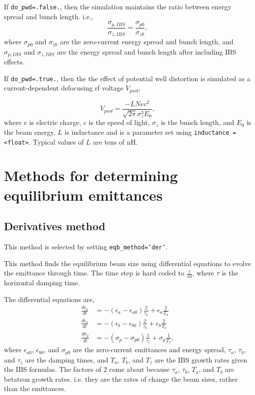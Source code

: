 \documentclass[11pt]{article}
\begin{document}
If {\tt do_pwd=.false.}, then the simulation maintains the ratio between energy spread and bunch length.
i.e.,
\begin{equation}
\frac{\sigma_{p,IBS}}{\sigma_{z,IBS}}=\frac{\sigma_{p0}}{\sigma_{z0}},
\end{equation}
where $\sigma_{p0}$ and $\sigma_{z0}$ are the zero-current energy spread and bunch length,
and $\sigma_{p,IBS}$ and $\sigma_{z,IBS}$ are the energy spread and bunch length after
including IBS effects.

If {\tt do_pwd=.true.}, then the the effect of potential well distortion is simulated as a 
current-dependent defocusing rf voltage $V_{pwd}$,

\begin{equation}
V_{pwd}=\frac{-L N e c^2}{\sqrt{2\pi}\sigma_z^3 E_0},
\end{equation}
where $e$ is electric charge, $c$ is the speed of light,
$\sigma_z$ is the bunch length, and $E_0$ is the beam energy.
$L$ is inductance and is a parameter set using {\tt inductance = <float>}.
Typical values of $L$ are tens of nH.

\section{Methods for determining equilibrium emittances}

\subsection{Derivatives method}
This method is selected by setting {\tt eqb_method=`der'}.

This method finds the equilibrium beam size using differential equations to 
evolve the emittance through time.  The time step is hard coded to $\frac{\tau}{10}$,
where $\tau$ is the horizontal damping time.

The differential equations are,
\begin{align}
\frac{d\epsilon_a}{dt}&= -\left(\epsilon_a-\epsilon_{a0}\right)\frac{2}{\tau_a}+\epsilon_a\frac{2}{T_a}\label{e:da}\\
\frac{d\epsilon_b}{dt}&= -\left(\epsilon_b-\epsilon_{b0}\right)\frac{2}{\tau_b}+\epsilon_b\frac{2}{T_b}\label{e:db}\\
\frac{d \sigma_p}{dt}&= -\left(\sigma_p-\sigma_{p0}\right)\frac{1}{\tau_z}+\sigma_p\frac{1}{T_z}\label{e:dp},
\end{align}
where $\epsilon_{a0}$, $\epsilon_{b0}$, and $\sigma_{p0}$ are the zero-current emittances and energy spread,
$\tau_a$, $\tau_b$, and $\tau_z$ are the damping times, and $T_a$, $T_b$, and $T_z$ are the IBS
growth rates given the IBS formulas.  The factors of $2$ come about because $\tau_a$, $\tau_b$,
$T_a$, and $T_b$ are betatron growth rates.  i.e.  they are the rates of change the beam sizes,
rather than the emittances.
\end{document}
